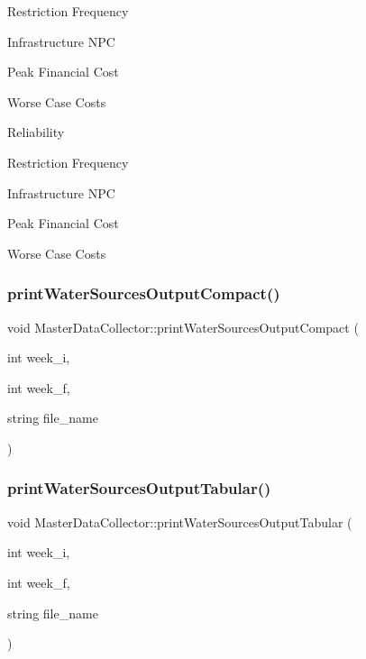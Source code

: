 Restriction Frequency

Infrastructure N\+PC

Peak Financial Cost

Worse Case Costs

Reliability

Restriction Frequency

Infrastructure N\+PC

Peak Financial Cost

Worse Case Costs \mbox{\label{classMasterDataCollector_adbe50e49689078e64a28450087ad0961_adbe50e49689078e64a28450087ad0961}} 
\subsubsection{\texorpdfstring{print\+Water\+Sources\+Output\+Compact()}{printWaterSourcesOutputCompact()}}
{\footnotesize\ttfamily void Master\+Data\+Collector\+::print\+Water\+Sources\+Output\+Compact (\begin{DoxyParamCaption}\item[{int}]{week\+\_\+i,  }\item[{int}]{week\+\_\+f,  }\item[{string}]{file\+\_\+name }\end{DoxyParamCaption})}

\mbox{\label{classMasterDataCollector_a77dd707b686d936118cd4e940156754f_a77dd707b686d936118cd4e940156754f}} 
\subsubsection{\texorpdfstring{print\+Water\+Sources\+Output\+Tabular()}{printWaterSourcesOutputTabular()}}
{\footnotesize\ttfamily void Master\+Data\+Collector\+::print\+Water\+Sources\+Output\+Tabular (\begin{DoxyParamCaption}\item[{int}]{week\+\_\+i,  }\item[{int}]{week\+\_\+f,  }\item[{string}]{file\+\_\+name }\end{DoxyParamCaption})}

